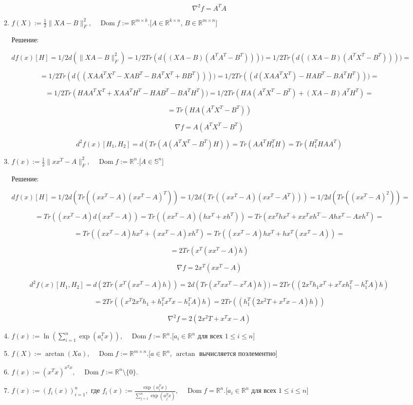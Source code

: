 \documentclass{article}
\newcommand{\R}{\mathbb{R}}
\renewcommand{\S}{\mathbb{S}}
\DeclareMathOperator*{\Dom}{Dom}
\begin{document}
\begin{enumerate}[label=\textbf{\arabic*}, leftmargin=0em]
\begin{enumerate}
$$
\nabla^2 f = A^TA
$$

\item $\displaystyle f(X) := \frac{1}{2} \| X A - B \|_F^2, \quad \Dom f := \R^{m \times k}$.\hfill[$A \in \R^{k \times n}$, $B \in \R^{m \times n}$]

Решение:

$$
df(x)[H] = 1/2 d(\| XA - B \|_F^2) = 1/2  Tr(d((XA - B)(A^TA^T - B^T)))) = 1/2 Tr(d((XA - B)(A^TX^T - B^T)))) =
$$

$$
= 1/2 Tr(d( (XAA^TX^T - XAB^T - BA^TX^T + BB^T)))) = 1/2 Tr(( d(XAA^TX^T) - HAB^T - BA^TH^T))) =
$$

$$
= 1/2 Tr(HAA^TX^T + XAA^TH^T - HAB^T - BA^TH^T)) = 1/2 Tr(HA(A^TX^T  - B^T) + (XA - B)A^TH^T) =
$$


$$
= Tr(HA(A^TX^T - B^T))
$$

$$
\nabla f = A(A^TX^T - B^T)
$$

$$
d^2 f(x)[H_1, H_2] = d(Tr(A(A^TX^T - B^T)H)) = Tr(AA^TH_1^TH) = Tr(H_1^THAA^T)
$$


\item $\displaystyle f(x) := \frac{1}{2} \| x x^T - A \|_F^2, \quad \Dom f := \R^n$.\hfill[$A \in \S^n$]

Решение:

$$
df(x)[H] = 1/2 d(Tr((x x^T - A)(x x^T - A)^T)) = 1/2 d(Tr((x x^T - A)(x x^T - A^T))) = 1/2 d(Tr((x x^T - A)^2)) =
$$

$$
= Tr((x x^T - A)d(x x^T - A)) = Tr((x x^T - A)(h x^T + xh^T)) = Tr(x x^T h x^T + x x^T x h^T - A h x^T - A xh^T) =
$$

$$
= Tr((x x^T- A )h x^T  + (x x^T - A)xh^T) = Tr((x x^T- A )h x^T  + hx^T(x x^T - A)) =
$$

$$
= 2Tr(x^T (x x^T - A)h)
$$


$$
\nabla f = 2x^T (x x^T - A)
$$

$$
d^2 f(x)[H_1, H_2] = d(2Tr(x^T (x x^T - A)h)) = 2d(Tr(x^T x x^T - x^TA)h)) = 2Tr((2x^Th_1 x^T + x^Txh_1^T - h_1^TA)h)
$$

$$
= 2Tr((x^T2x^Th_1+ h_1^Tx^Tx - h_1^TA)h) = 2Tr((h_1^T(2x^2T+ x^Tx -A)h))
$$

$$
\nabla^2 f  = 2(2x^2T+ x^Tx -A)
$$



\item $\displaystyle f(x) := \ln\left(\sum\limits_{i=1}^n \exp(a_i^T x) \right), \quad \Dom f := \R^n$.\hfill[$a_i \in \R^n$ для всех $1 \leq i \leq n$]
\item $\displaystyle f(X) := \arctan(X a), \quad \Dom f := \R^{m \times n}$.\hfill[$a \in \R^n$, $\arctan$ вычисляется поэлементно]
\item $\displaystyle f(x) := (x^T x)^{x^T x}, \quad \Dom f := \R^n \setminus \{0\}$.
\item $\displaystyle f(x) := (f_i(x))_{i=1}^n, $ где $\displaystyle f_i(x) := \frac{\exp(a_i^T x)}{\sum\limits_{j=1}^n \exp(a_j^T x)}, \quad \Dom f = \R^n$.\hfill[$a_i \in \R^n$ для всех $1 \leq i \leq n$]


\end{enumerate}
\end{enumerate}
\end{document}
